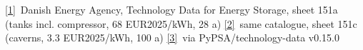 \href{https://ens.dk/en/analyses-and-statistics/technology-data-energy-storage}{[1]}~Danish Energy Agency, Technology Data for Energy Storage, sheet 151a (tanks incl. compressor, 68 EUR2025/kWh, 28 a)\quad
\href{https://ens.dk/en/analyses-and-statistics/technology-data-energy-storage}{[2]}~same catalogue, sheet 151c (caverns, 3.3 EUR2025/kWh, 100 a)\quad
\href{https://github.com/PyPSA/technology-data/blob/v0.15.0/outputs/costs_2025.csv}{[3]}~via PyPSA/technology-data v0.15.0
